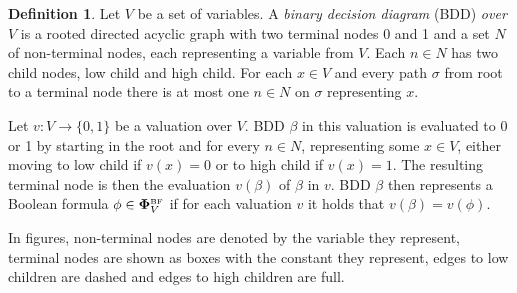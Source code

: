 \documentclass[
  digital, %
  color,
  twoside, %
  table,   %
  nolof,     %
  nolot,     %
]{fithesis3}
\theoremstyle{definition}
\newtheorem{definition}{Definition}
\theoremstyle{remark}
\newcommand{\BF}[1]{\mathbf{\Phi}_{#1}^{\normalfont{\text{\tiny BF}}}}
\begin{document}
\begin{definition}
  Let $V$ be a set of variables. A \emph{binary decision diagram} (BDD) \emph{over $V$} is a rooted directed acyclic graph with two terminal nodes 0 and 1 and a set $N$ of non-terminal nodes, each representing a variable from $V$. Each $n \in N$ has two child nodes, low child and high child. For each $x \in V$ and every path $\sigma$ from root to a terminal node there is at most one $n \in N$ on $\sigma$ representing $x$.
\end{definition}


Let $v\colon V \to \{0,1\}$ be a valuation over $V$. BDD $\beta$ in this valuation is evaluated to 0 or 1 by starting in the root and for every $n \in N$, representing some $x \in V$, either moving to low child if $v(x) = 0$ or to high child if $v(x) = 1$. The resulting terminal node is then the evaluation $v(\beta)$ of $\beta$ in $v$. BDD $\beta$ then represents a Boolean formula $\phi \in \BF{V}$ if for each valuation $v$ it holds that $v(\beta) = v(\phi)$.

In figures, non-terminal nodes are denoted by the variable they represent, terminal nodes are shown as boxes with the constant they represent, edges to low children are dashed and edges to high children are full.
\end{document}
